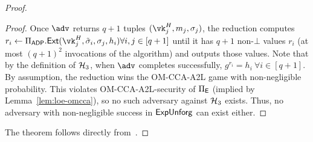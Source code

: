 \begin{proof}
\begin{proof}
        Once $\adv$ returns $q+1$ tuples $(\vk_j^H,m_j,\sigma_j)$, the reduction computes $r_i \gets \Pi_\ADP.\ext(\vk_j^H,\presig_i,\sigma_j,h_i) \forall i,j \in [q+1]$ until it has $q+1$ non-$\bot$ values $r_i$ (at most $(q+1)^2$ invocations of the algorithm) and outputs those values. Note that by the definition of $\mathcal{H}_3$, when $\adv$ completes successfully, $g^{r_i} = h_i~\forall i \in [q+1]$. By assumption, the reduction wins the OM-CCA-A2L game with non-negligible probability. This violates OM-CCA-A2L-security of $\Pi_{\mathsf{E}}$ (implied by Lemma~\ref{lem:loe-omcca}), so no such adversary against $\mathcal{H}_3$ exists. Thus, no adversary with non-negligible success in $\mathsf{ExpUnforg}$ can exist either.
        \end{proof}
        
        The theorem follows directly from~.
        \end{proof}